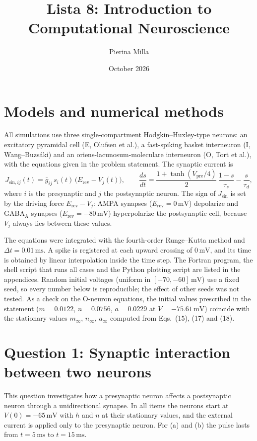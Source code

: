 \documentclass[12pt]{article}
\title{Lista 8: Introduction to Computational Neuroscience}
\author{Pierina Milla}
\date{October 2026}
\newcommand{\ms}{\,\mathrm{ms}}
\newcommand{\mV}{\,\mathrm{mV}}
\begin{document}
\maketitle

\section*{Models and numerical methods}

All simulations use three single-compartment Hodgkin--Huxley-type neurons: an excitatory pyramidal cell (E, Olufsen et al.), a fast-spiking basket interneuron (I, Wang--Buzs\'aki) and an oriens-lacunosum-moleculare interneuron (O, Tort et al.), with the equations given in the problem statement. The synaptic current is
\[
J_{\mathrm{sin},ij}(t)=\bar g_{ij}\,s_i(t)\,\bigl(E_{\mathrm{rev}}-V_j(t)\bigr),
\qquad
\frac{ds}{dt}=\frac{1+\tanh(V_{\mathrm{pre}}/4)}{2}\,\frac{1-s}{\tau_s}-\frac{s}{\tau_d},
\]
where $i$ is the presynaptic and $j$ the postsynaptic neuron. The sign of $J_{\mathrm{sin}}$ is set by the driving force $E_{\mathrm{rev}}-V_j$: AMPA synapses ($E_{\mathrm{rev}}=0\mV$) depolarize and GABA$_\mathrm{A}$ synapses ($E_{\mathrm{rev}}=-80\mV$) hyperpolarize the postsynaptic cell, because $V_j$ always lies between these values.

The equations were integrated with the fourth-order Runge--Kutta method and $\Delta t=0.01\ms$. A spike is registered at each upward crossing of $0\mV$, and its time is obtained by linear interpolation inside the time step. The Fortran program, the shell script that runs all cases and the Python plotting script are listed in the appendices. Random initial voltages (uniform in $[-70,-60]\mV$) use a fixed seed, so every number below is reproducible; the effect of other seeds was not tested. As a check on the O-neuron equations, the initial values prescribed in the statement ($m=0.0122$, $n=0.0756$, $a=0.0229$ at $V=-75.61\mV$) coincide with the stationary values $m_\infty$, $n_\infty$, $a_\infty$ computed from Eqs.~(15), (17) and (18).

\section*{Question 1: Synaptic interaction between two neurons}

This question investigates how a presynaptic neuron affects a postsynaptic neuron through a unidirectional synapse. In all items the neurons start at $V(0)=-65\mV$ with $h$ and $n$ at their stationary values, and the external current is applied only to the presynaptic neuron. For (a) and (b) the pulse lasts from $t=5\ms$ to $t=15\ms$.
\end{document}
